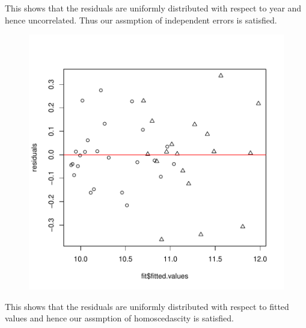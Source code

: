 \documentclass[12pt]{article}
\begin{document}
This shows that the residuals are uniformly distributed with respect to year and hence uncorrelated. Thus our assmption of independent errors is satisfied.

\begin{figure}[H]
\includegraphics{HW4-018}
\end{figure}
This shows that the residuals are uniformly distributed with respect to fitted values and hence our assmption of homoscedascity is satisfied.
\end{document}
